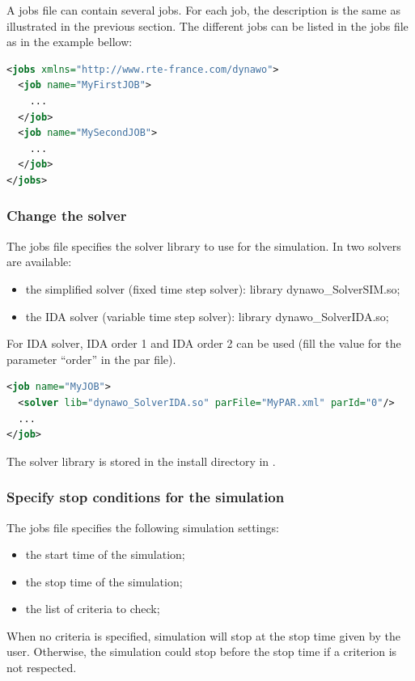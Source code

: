 \documentclass[a4paper, 12pt]{report}
\begin{document}
A jobs file can contain several jobs. For each job, the description is the same as illustrated in the previous section. The different jobs can be listed in the jobs file as in the example bellow:

\begin{lstlisting}[language=XML, morekeywords={name}]
<jobs xmlns="http://www.rte-france.com/dynawo">
  <job name="MyFirstJOB">
    ...
  </job>
  <job name="MySecondJOB">
    ...
  </job>
</jobs>
\end{lstlisting}

\subsubsection{Change the solver}

The jobs file specifies the solver library to use for the simulation. In \Dynawo two solvers are available:
\begin{itemize}
\item the simplified solver (fixed time step solver): library dynawo\_SolverSIM.so;
\item the IDA solver (variable time step solver): library dynawo\_SolverIDA.so;
\end{itemize}

For IDA solver, IDA order 1 and IDA order 2 can be used (fill the value for the parameter ``order'' in the par file).

\begin{lstlisting}[language=XML, morekeywords={lib}]
<job name="MyJOB">
  <solver lib="dynawo_SolverIDA.so" parFile="MyPAR.xml" parId="0"/>
  ...
</job>
\end{lstlisting}

The solver library is stored in the install directory in .

\subsubsection{Specify stop conditions for the simulation}

The jobs file specifies the following simulation settings:
\begin{itemize}
\item the start time of the simulation;
\item the stop time of the simulation;
\item the list of criteria to check;
\end{itemize}

When no criteria is specified, simulation will stop at the stop time given by
the user. Otherwise, the simulation could stop before the stop
time if a criterion is not respected.
\end{document}
